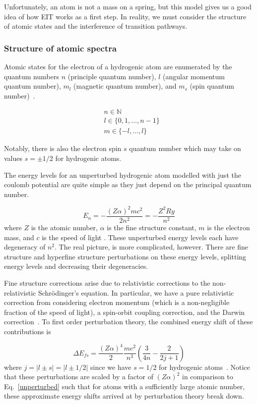 \documentclass[aps,pra,showpacs,amsmath,amssymb,nofootinbib,longbibliography,superscriptaddress
]{revtex4-1}
\theoremstyle{definition}
\theoremstyle{remark}
\newcommand{\0}{\hat{0}}
\begin{document}
Unfortunately, an atom is not a mass on a spring, but this model gives us a good idea of how EIT works as a first step. In reality, we must consider the structure of atomic states and the interference of transition pathways.


\subsubsection{Structure of atomic spectra}

Atomic states for the electron of a hydrogenic atom are enumerated by the quantum numbers $n$ (principle quantum number), $l$ (angular momentum quantum number), $m_l$ (magnetic quantum number), and $m_s$ (spin quantum number)~\cite{McIntyre}.

\begin{align}
    &n \in \mathbb{N}\\
    &l \in \{0,1,\ldots,n-1\}\\
    &m \in \{-l, \ldots, l\}
\end{align}

Notably, there is also the electron spin $s$ quantum number which may take on values $s = \pm 1/2$ for hydrogenic atoms.

The energy levels for an unperturbed hydrogenic atom modelled with just the coulomb potential are quite simple as they just depend on the principal quantum number.

\begin{equation}\label{unperturbed}
    E_n = - \frac{(Z \alpha)^2 mc^2}{2n^2} = - \frac{Z^2 Ry}{n^2}
\end{equation}
where $Z$ is the atomic number, $\alpha$ is the fine structure constant, $m$ is the electron mass, and $c$ is the speed of light \cite{Tong}. These unperturbed energy levels each have degeneracy of $n^2$. The real picture, is more complicated, however. There are fine structure and hyperfine structure perturbations on these energy levels, splitting energy levels and decreasing their degeneracies.

Fine structure corrections arise due to relativistic corrections to the non-relativistic Schr\"{o}dinger's equation. In particular, we have a pure relativistic correction from considering electron momentum (which is a non-negligible fraction of the speed of light), a spin-orbit coupling correction, and the Darwin correction~\cite{Tong}. To first order perturbation theory, the combined energy shift of these contributions is 

\begin{equation}
    \Delta E_{fs} = \frac{(Z \alpha)^4}{2} \frac{mc^2}{n^3}\left( \frac{3}{4n} - \frac{2}{2j+1} \right)
\end{equation}
where $j = |l \pm s| = |l \pm 1/2|$ since we have $s=1/2$ for hydrogenic atoms~\cite{Tong}. Notice that these perturbations are scaled by a factor of $(Z \alpha)^2$ in comparison to Eq.~\eqref{unperturbed} such that for atoms with a sufficiently large atomic number, these approximate energy shifts arrived at by perturbation theory break down.
\end{document}
